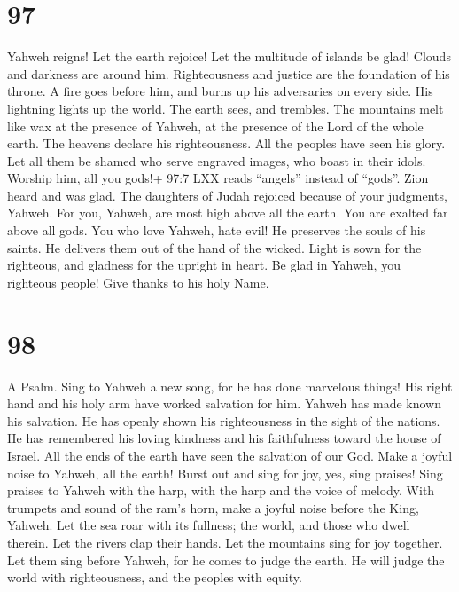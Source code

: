\hypertarget{section-87}{%
\section{97}\label{section-87}}

 Yahweh reigns! Let the earth rejoice! Let the multitude of
islands be glad!  Clouds and darkness are around him.
Righteousness and justice are the foundation of his throne. 
A fire goes before him, and burns up his adversaries on every side.
 His lightning lights up the world. The earth sees, and
trembles.  The mountains melt like wax at the presence of
Yahweh, at the presence of the Lord of the whole earth.  The
heavens declare his righteousness. All the peoples have seen his glory.
 Let all them be shamed who serve engraved images, who boast
in their idols. Worship him, all you gods!+ 97:7 LXX reads ``angels''
instead of ``gods''.  Zion heard and was glad. The daughters
of Judah rejoiced because of your judgments, Yahweh.  For
you, Yahweh, are most high above all the earth. You are exalted far
above all gods.  You who love Yahweh, hate evil! He
preserves the souls of his saints. He delivers them out of the hand of
the wicked.  Light is sown for the righteous, and gladness
for the upright in heart.  Be glad in Yahweh, you righteous
people! Give thanks to his holy Name.

\hypertarget{section-88}{%
\section{98}\label{section-88}}

A Psalm.  Sing to Yahweh a new song, for he has done
marvelous things! His right hand and his holy arm have worked salvation
for him.  Yahweh has made known his salvation. He has openly
shown his righteousness in the sight of the nations.  He has
remembered his loving kindness and his faithfulness toward the house of
Israel. All the ends of the earth have seen the salvation of our God.
 Make a joyful noise to Yahweh, all the earth! Burst out and
sing for joy, yes, sing praises!  Sing praises to Yahweh
with the harp, with the harp and the voice of melody.  With
trumpets and sound of the ram's horn, make a joyful noise before the
King, Yahweh.  Let the sea roar with its fullness; the
world, and those who dwell therein.  Let the rivers clap
their hands. Let the mountains sing for joy together.  Let
them sing before Yahweh, for he comes to judge the earth. He will judge
the world with righteousness, and the peoples with equity.

